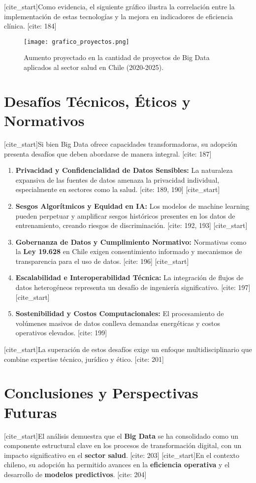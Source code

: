 \documentclass[12pt, a4paper]{article}
\begin{document}
[cite_start]Como evidencia, el siguiente gráfico ilustra la correlación entre la implementación de estas tecnologías y la mejora en indicadores de eficiencia clínica. [cite: 184]

\begin{figure}[h!]
    \centering
    \texttt{[image: grafico\_proyectos.png]}
    \caption{Aumento proyectado en la cantidad de proyectos de Big Data aplicados al sector salud en Chile (2020-2025).}
    \label{fig:grafico_proyectos}
\end{figure}

\section{Desafíos Técnicos, Éticos y Normativos}
[cite_start]Si bien Big Data ofrece capacidades transformadoras, su adopción presenta desafíos que deben abordarse de manera integral. [cite: 187]
\begin{enumerate}
    \item \textbf{Privacidad y Confidencialidad de Datos Sensibles:} La naturaleza expansiva de las fuentes de datos amenaza la privacidad individual, especialmente en sectores como la salud. [cite: 189, 190]
    [cite_start]\item \textbf{Sesgos Algorítmicos y Equidad en IA:} Los modelos de machine learning pueden perpetuar y amplificar sesgos históricos presentes en los datos de entrenamiento, creando riesgos de discriminación. [cite: 192, 193]
    [cite_start]\item \textbf{Gobernanza de Datos y Cumplimiento Normativo:} Normativas como la \textbf{Ley 19.628} en Chile exigen consentimiento informado y mecanismos de transparencia para el uso de datos. [cite: 196]
    [cite_start]\item \textbf{Escalabilidad e Interoperabilidad Técnica:} La integración de flujos de datos heterogéneos representa un desafío de ingeniería significativo. [cite: 197]
    [cite_start]\item \textbf{Sostenibilidad y Costos Computacionales:} El procesamiento de volúmenes masivos de datos conlleva demandas energéticas y costos operativos elevados. [cite: 199]
\end{enumerate}
[cite_start]La superación de estos desafíos exige un enfoque multidisciplinario que combine expertise técnico, jurídico y ético. [cite: 201]

\section{Conclusiones y Perspectivas Futuras}
[cite_start]El análisis demuestra que el \textbf{Big Data} se ha consolidado como un componente estructural clave en los procesos de transformación digital, con un impacto significativo en el \textbf{sector salud}. [cite: 203] [cite_start]En el contexto chileno, su adopción ha permitido avances en la \textbf{eficiencia operativa} y el desarrollo de \textbf{modelos predictivos}. [cite: 204]
\end{document}
